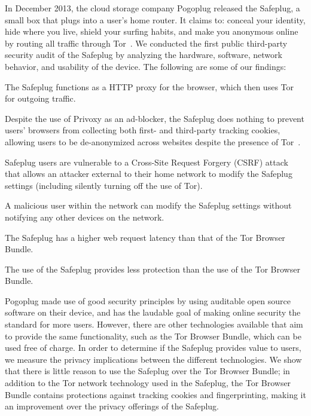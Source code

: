 \documentclass[letterpaper,twocolumn,10pt]{article}
\begin{document}
In December 2013, the cloud storage company Pogoplug released the Safeplug, a small box that plugs into a user's home router.  It claims to: conceal your identity, hide where you live, shield your surfing habits, and make you anonymous online by routing all traffic through Tor~\cite{safeplug}.  We conducted the first public third-party security audit of the Safeplug by analyzing the hardware, software, network behavior, and usability of the device.  The following are some of our findings:

\begin{compactitem} \setlength{\itemsep}{.2mm}
\item The Safeplug functions as a HTTP proxy for the browser, which then uses Tor for outgoing traffic.
\item Despite the use of Privoxy as an ad-blocker, the Safeplug does nothing to prevent users' browsers from collecting both first- and third-party tracking cookies, allowing users to be de-anonymized across websites despite the presence of Tor~\cite{arvindpets}.
\item Safeplug users are vulnerable to a Cross-Site Request Forgery (CSRF) attack that allows an attacker external to their home network to modify the Safeplug settings (including silently turning off the use of Tor).
\item A malicious user within the network can modify the Safeplug settings without notifying any other devices on the network.
\item The Safeplug has a higher web request latency than that of the Tor Browser Bundle.
\item The use of the Safeplug provides less protection than the use of the Tor Browser Bundle.
\end{compactitem} 

Pogoplug made use of good security principles by using auditable open source software on their device, and has the laudable goal of making online security the standard for more users. However, there are other technologies available that aim to provide the same functionality, such as the Tor Browser Bundle, which can be used free of charge.  In order to determine if the Safeplug provides value to users, we measure the privacy implications between the different technologies.  We show that there is little reason to use the Safeplug over the Tor Browser Bundle; in addition to the Tor network technology used in the Safeplug, the Tor Browser Bundle contains protections against tracking cookies and fingerprinting, making it an improvement over the privacy offerings of the Safeplug.
\end{document}
